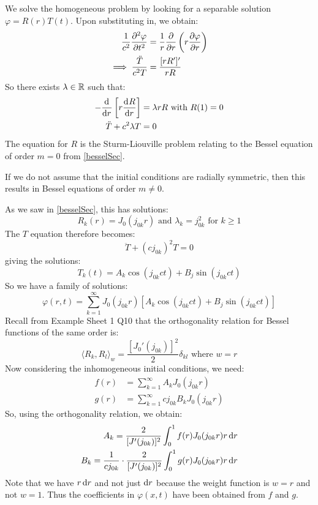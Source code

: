 \documentclass[../main.tex]{subfiles}
\begin{document}
We solve the homogeneous problem by looking for a separable solution $\varphi = R(r)T(t)$.
Upon substituting in, we obtain:
\begin{align*}
  \frac{1}{c^2} \pderiv[2]{\varphi}{t} &= \frac{1}{r} \pderiv{}{r}\left(r \pderiv{\varphi}{r}\right) \\
  \implies \frac{\ddot{T}}{c^2 T} &= \frac{[r R']'}{r R}
\end{align*}
So there exists $\lambda \in \mathbb{R}$ such that:
\begin{align*}
  -\deriv{}{r}\left[r \deriv{R}{r}\right] &= \lambda r R \text{ with } R(1) = 0 \\
  \ddot{T} + c^2 \lambda T &= 0
\end{align*}
The equation for $R$ is the Sturm-Liouville problem relating to the Bessel equation of order $m = 0$ from \cref{besselSec}.
\begin{remark}
  If we do not assume that the initial conditions are radially symmetric, then this results in Bessel equations of order $m \neq 0$.
\end{remark}
As we saw in \cref{besselSec}, this has solutions:
\[
  R_k(r) = J_0(j_{0 k} r) \text{ and } \lambda_k = j^{2}_{0 k} \text{ for } k \geq 1
\]
The $T$ equation therefore becomes:
\[
  \ddot{T} + (c j_{0 k})^2 T = 0
\]
giving the solutions:
\[
  T_k(t) = A_k \cos(j_{0 k} ct) + B_j \sin(j_{0 k} ct)
\]
So we have a family of solutions:
\[
  \varphi(r, t) = \sum_{k = 1}^{\infty} J_0(j_{0 k} r)[A_k \cos(j_{0 k} ct) + B_j \sin(j_{0 k} ct)]
\]
Recall from Example Sheet 1 Q10 that the orthogonality relation for Bessel functions of the same order is:
\[
  \langle R_k, R_l \rangle_w = \frac{[J_0'(j_{0 k})]^2}{2} \delta_{k l} \text{ where } w = r
\]
Now considering the inhomogeneous initial conditions, we need:
\begin{align*}
  f(r) &= \sum_{k = 1}^{\infty} A_k J_0(j_{0 k} r) \\
  g(r) &= \sum_{k = 1}^{\infty} c j_{0 k} B_k J_0(j_{0 k} r)
\end{align*}
So, using the orthogonality relation, we obtain:
\begin{align*}
  A_k = \frac{2}{[J'(j_{0 k})]^2} \int_{0}^{1} f(r) J_0(j_{0 k} r) r \d{r} \\
  B_k = \frac{1}{c j_{0 k}} \cdot \frac{2}{[J'(j_{0 k})]^2} \int_{0}^{1} g(r) J_0(j_{0 k} r) r \d{r}
\end{align*}
Note that we have $r \d{r}$ and not just $\d{r}$ because the weight function is $w = r$ and not $w = 1$.
Thus the coefficients in $\varphi(x, t)$ have been obtained from $f$ and $g$.
\end{document}
